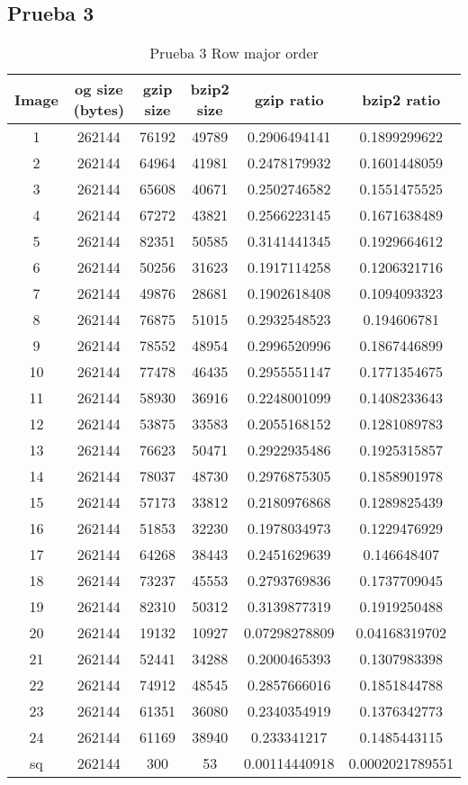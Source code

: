 \documentclass[12pt]{article}
\begin{document}
\subsection*{Prueba 3}
\begin{table}[h]
	\centering
	\begin{tabular}{|c|c|c|c|c|c|}
		\hline
		Image & og size (bytes) & gzip size & bzip2 size & gzip ratio & bzip2 ratio\\
		\hline
		1 &262144   &76192 &49789 &0.2906494141 &0.1899299622 \\
		\hline
		2 &262144   &64964 &41981 &0.2478179932  &0.1601448059 \\
		\hline
		3 &262144   &65608 &40671 &0.2502746582  &0.1551475525 \\
		\hline
		4 &262144   &67272 &43821 &0.2566223145  &0.1671638489 \\
		\hline
		5 &262144   &82351 &50585 &0.3141441345 &0.1929664612 \\
		\hline
		6 &262144   &50256 &31623 &0.1917114258 &0.1206321716 \\
		\hline
		7 &262144   &49876 &28681 &0.1902618408 &0.1094093323 \\
		\hline
		8 &262144   &76875 &51015 &0.2932548523 &0.194606781 \\
		\hline
		9 &262144   &78552 &48954 &0.2996520996 &0.1867446899 \\
		\hline
		10&262144   &77478 &46435 &0.2955551147 &0.1771354675 \\
		\hline
		11&262144   &58930 &36916 &0.2248001099 &0.1408233643 \\
		\hline
		12&262144   &53875 &33583 &0.2055168152 &0.1281089783 \\
		\hline
		13&262144   &76623 &50471 &0.2922935486 &0.1925315857 \\
		\hline
		14&262144   &78037 &48730 &0.2976875305 &0.1858901978 \\
		\hline
		15&262144   &57173 &33812 &0.2180976868 &0.1289825439 \\
		\hline
		16&262144   &51853 &32230 &0.1978034973 &0.1229476929 \\
		\hline
		17&262144   &64268 &38443 &0.2451629639 &0.146648407 \\
		\hline
		18&262144   &73237 &45553 &0.2793769836 &0.1737709045 \\
		\hline
		19&262144   &82310 &50312 &0.3139877319 &0.1919250488 \\
		\hline
		20&262144   &19132 &10927 &0.07298278809 &0.04168319702 \\
		\hline
		21&262144   &52441 &34288 &0.2000465393 &0.1307983398 \\
		\hline
		22&262144   &74912 &48545 &0.2857666016&0.1851844788 \\
		\hline
		23&262144   &61351 &36080 &0.2340354919&0.1376342773 \\
		\hline
		24&262144   &61169 &38940 &0.233341217&0.1485443115 \\
		\hline
		sq&262144 &300 &53 &0.00114440918 &0.0002021789551 \\
		\hline

	\end{tabular}
	\label{tab:Prueba}
	\caption{Prueba 3 Row major order}
\end{table}
\end{document}

